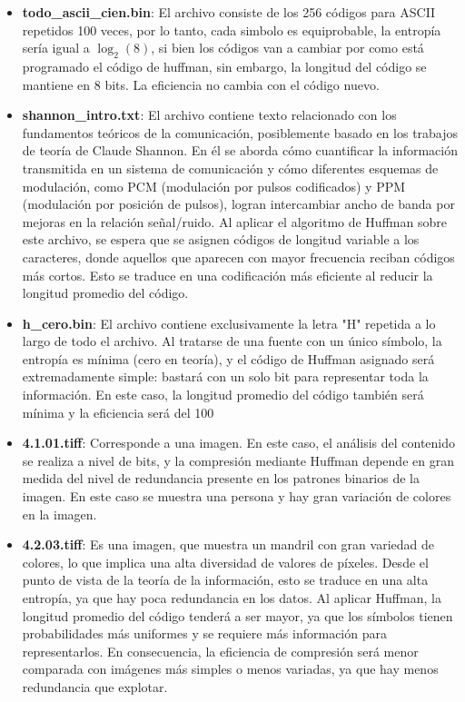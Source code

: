 \documentclass[conference,onecolumn,12pt]{IEEEtran}
\numberwithin{equation}{subsection}
\begin{document}
\begin{itemize}
    \item \textbf{todo\_ascii\_cien.bin}: El archivo consiste de los 256 códigos para ASCII repetidos 100 veces, por lo tanto, cada simbolo es equiprobable, la entropía sería igual a $\log_2(8)$, si bien los códigos van a cambiar por como está programado el código de huffman, sin embargo, la longitud del código se mantiene en 8 bits. La eficiencia no cambia con el código nuevo.
    \item \textbf{shannon\_intro.txt}: El archivo contiene texto relacionado con los fundamentos teóricos de la comunicación, posiblemente basado en los trabajos de teoría de Claude Shannon. En él se aborda cómo cuantificar la información transmitida en un sistema de comunicación y cómo diferentes esquemas de modulación, como PCM (modulación por pulsos codificados) y PPM (modulación por posición de pulsos), logran intercambiar ancho de banda por mejoras en la relación señal/ruido. Al aplicar el algoritmo de Huffman sobre este archivo, se espera que se asignen códigos de longitud variable a los caracteres, donde aquellos que aparecen con mayor frecuencia reciban códigos más cortos. Esto se traduce en una codificación más eficiente al reducir la longitud promedio del código.
    \item \textbf{h\_cero.bin}: El archivo contiene exclusivamente la letra "H" repetida a lo largo de todo el archivo. Al tratarse de una fuente con un único símbolo, la entropía es mínima (cero en teoría), y el código de Huffman asignado será extremadamente simple: bastará con un solo bit para representar toda la información. En este caso, la longitud promedio del código también será mínima y la eficiencia será del 100%
    \item \textbf{4.1.01.tiff}: Corresponde a una imagen. En este caso, el análisis del contenido se realiza a nivel de bits, y la compresión mediante Huffman depende en gran medida del nivel de redundancia presente en los patrones binarios de la imagen. En este caso se muestra una persona y hay gran variación de colores en la imagen.
    \item \textbf{4.2.03.tiff}: Es una imagen, que muestra un mandril con gran variedad de colores, lo que implica una alta diversidad de valores de píxeles. Desde el punto de vista de la teoría de la información, esto se traduce en una alta entropía, ya que hay poca redundancia en los datos. Al aplicar Huffman, la longitud promedio del código tenderá a ser mayor, ya que los símbolos tienen probabilidades más uniformes y se requiere más información para representarlos. En consecuencia, la eficiencia de compresión será menor comparada con imágenes más simples o menos variadas, ya que hay menos redundancia que explotar.

\end{itemize}
\end{document}
